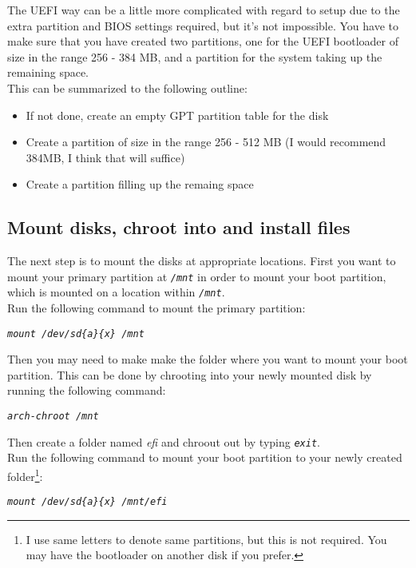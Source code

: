 \documentclass{article}
\newcommand{\code}[1]{\begin{center}
		\textit{\texttt{#1}}
\end{center}}
\newcommand{\inlineCode}[1]{\textit{\texttt{#1}}}
\begin{document}
 	 The UEFI way can be a little more complicated with regard to setup due to the extra partition and BIOS settings required, but it's not impossible.  You have to make sure that you have created two partitions, one for the UEFI bootloader of size in the range 256 - 384 MB, and a partition for the system taking up the remaining space. \\
 	 
 	 This can be summarized to the following outline:
 	 
 	 \begin{itemize}
 	 	\item If not done, create an empty GPT partition table for the disk
 	 	\item Create a partition of size in the range 256 - 512 MB (I would recommend 384MB, I think that will suffice)
 	 	\item Create a partition filling up the remaing space
 	 \end{itemize}
  
  \subsection{Mount disks, chroot into and install files}
  
  The next step is to mount the disks at appropriate locations. First you want to mount your primary partition at \inlineCode{/mnt} in order to mount your boot partition, which is mounted on a location within \inlineCode{/mnt}.\\
  
  Run the following command to mount the primary partition:
  
  \code{mount /dev/sd\{a\}\{x\} /mnt}
  
  Then you may need to make make the folder where you want to mount your boot partition. This can be done by chrooting into your newly mounted disk by running the following command:
  
  \code{arch-chroot /mnt}
  
  Then create a folder named \textit{efi} and chroout out by typing \inlineCode{exit}.\\
  
  Run the following command to mount your boot partition to your newly created folder\footnote{I use same letters to denote same partitions, but this is not required. You may have the bootloader on another disk if you prefer.}:
  
  \code{mount /dev/sd\{a\}\{x\} /mnt/efi}
  
 	 
\end{document}
